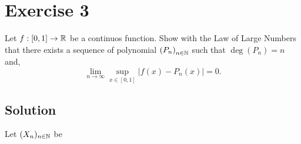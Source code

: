 \section{Exercise 3}
Let $f : [0,1]\to \mathbb{R}$ be a continuos function. Show with the Law of Large Numbers that there exists a sequence of polynomial ${(P_n)}_{n\in \mathbb{N}}$ such that $\deg(P_n) = n$ and,
\[ \lim_{n\to\infty} \sup_{x\in [0,1]} |f(x) - P_n(x)| = 0. \]

\subsection*{Solution}

Let $(X_n)_{n\in \mathbb{N}}$ be 